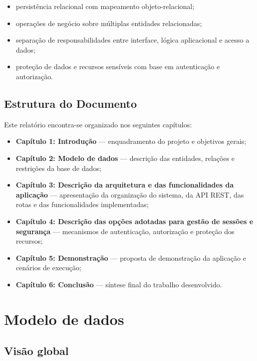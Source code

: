 \documentclass[10pt,a4paper]{report}
\begin{document}
\begin{itemize}
    \item persistência relacional com mapeamento objeto-relacional;
    \item operações de negócio sobre múltiplas entidades relacionadas;
    \item separação de responsabilidades entre interface, lógica aplicacional e acesso a dados;
    \item proteção de dados e recursos sensíveis com base em autenticação e autorização.
\end{itemize}

\section{Estrutura do Documento}

Este relatório encontra-se organizado nos seguintes capítulos:

\begin{itemize}
    \item \textbf{Capítulo 1: Introdução} --- enquadramento do projeto e objetivos gerais;
    \item \textbf{Capítulo 2: Modelo de dados} --- descrição das entidades, relações e restrições da base de dados;
    \item \textbf{Capítulo 3: Descrição da arquitetura e das funcionalidades da aplicação} --- apresentação da organização do sistema, da \ac{API} \ac{REST}, das rotas e das funcionalidades implementadas;
    \item \textbf{Capítulo 4: Descrição das opções adotadas para gestão de sessões e segurança} --- mecanismos de autenticação, autorização e proteção dos recursos;
    \item \textbf{Capítulo 5: Demonstração} --- proposta de demonstração da aplicação e cenários de execução;
    \item \textbf{Capítulo 6: Conclusão} --- síntese final do trabalho desenvolvido.
\end{itemize}

\chapter{Modelo de dados}
\label{chap:modelodados}

\section{Visão global}
\end{document}
